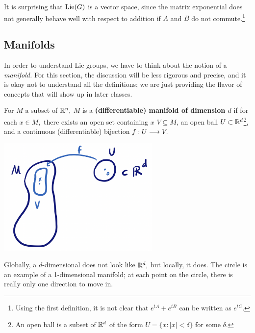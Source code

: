 It is surprising that $\operatorname{Lie}(G)$ is a vector space, since the matrix exponential does not generally behave well with respect to addition if $A$ and $B$ do not commute.\footnote{Using the first definition, it is not clear that $e^{tA} + e^{tB}$ can be written as $e^{tC}$.}


\subsection{Manifolds}
In order to understand Lie groups, we have to think about the notion of a \emph{manifold.} For this section, the discussion will be less rigorous and precise, and it is okay not to understand all the definitions; we are just providing the flavor of concepts that will show up in later classes.
\begin{definition}
For $M$ a subset of $\mathbb R^n,$ $M$ is a \textbf{(differentiable) manifold of dimension $d$} if for each $x \in M,$ there exists an open set containing $x$ $V \subseteq M$, an open ball $U \subset \mathbb R^d$\footnote{An open ball is a subset of $\mathbb R^d$ of the form $U = \{x : |x| < \delta\}$ for some $\delta.$}, and a continuous (differentiable) bijection $f: U \longrightarrow V.$

\begin{center}
    \includegraphics[width=8cm]{Lecture Files and Images/lec33-manifold.png}
\end{center}

\end{definition}



Globally, a $d$-dimensional does not look like $\mathbb R^d,$ but locally, it does. The circle is an example of a 1-dimensional manifold; at each point on the circle, there is really only one direction to move in.


